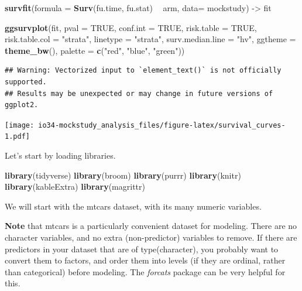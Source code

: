 \documentclass[
]{book}
\newenvironment{Shaded}{\begin{snugshade}}{\end{snugshade}}
\newcommand{\DataTypeTok}[1]{\textcolor[rgb]{0.13,0.29,0.53}{#1}}
\newcommand{\KeywordTok}[1]{\textcolor[rgb]{0.13,0.29,0.53}{\textbf{#1}}}
\newcommand{\NormalTok}[1]{#1}
\newcommand{\OperatorTok}[1]{\textcolor[rgb]{0.81,0.36,0.00}{\textbf{#1}}}
\newcommand{\OtherTok}[1]{\textcolor[rgb]{0.56,0.35,0.01}{#1}}
\newcommand{\StringTok}[1]{\textcolor[rgb]{0.31,0.60,0.02}{#1}}
\begin{document}
\begin{Shaded}
\begin{Highlighting}[]
\KeywordTok{survfit}\NormalTok{(}\DataTypeTok{formula =} \KeywordTok{Surv}\NormalTok{(fu.time, fu.stat) }\OperatorTok{~}\StringTok{ }\NormalTok{arm, }\DataTypeTok{data=}\NormalTok{ mockstudy) ->}
\NormalTok{fit}

\KeywordTok{ggsurvplot}\NormalTok{(fit,}
           \DataTypeTok{pval =} \OtherTok{TRUE}\NormalTok{, }\DataTypeTok{conf.int =} \OtherTok{TRUE}\NormalTok{,}
           \DataTypeTok{risk.table =} \OtherTok{TRUE}\NormalTok{,}
           \DataTypeTok{risk.table.col =} \StringTok{"strata"}\NormalTok{,}
           \DataTypeTok{linetype =} \StringTok{"strata"}\NormalTok{,}
           \DataTypeTok{surv.median.line =} \StringTok{"hv"}\NormalTok{,}
           \DataTypeTok{ggtheme =} \KeywordTok{theme_bw}\NormalTok{(),}
           \DataTypeTok{palette =} \KeywordTok{c}\NormalTok{(}\StringTok{"red"}\NormalTok{, }\StringTok{"blue"}\NormalTok{, }\StringTok{"green"}\NormalTok{)) }
\end{Highlighting}
\end{Shaded}

\begin{verbatim}
## Warning: Vectorized input to `element_text()` is not officially supported.
## Results may be unexpected or may change in future versions of ggplot2.
\end{verbatim}

\texttt{[image: io34-mockstudy\_analysis\_files/figure-latex/survival\_curves-1.pdf]}

Let's start by loading libraries.

\begin{Shaded}
\begin{Highlighting}[]
\KeywordTok{library}\NormalTok{(tidyverse)}
\KeywordTok{library}\NormalTok{(broom)}
\KeywordTok{library}\NormalTok{(purrr)  }
\KeywordTok{library}\NormalTok{(knitr)}
\KeywordTok{library}\NormalTok{(kableExtra)}
\KeywordTok{library}\NormalTok{(magrittr)}
\end{Highlighting}
\end{Shaded}

We will start with the mtcars dataset, with its many numeric variables.

\textbf{Note} that mtcars is a particularly convenient dataset for modeling. There are no character variables, and no extra (non-predictor) variables to remove. If there are predictors in your dataset that are of type(character), you probably want to convert them to factors, and order them into levels (if they are ordinal, rather than categorical) before modeling. The \emph{forcats} package can be very helpful for this.
\end{document}
